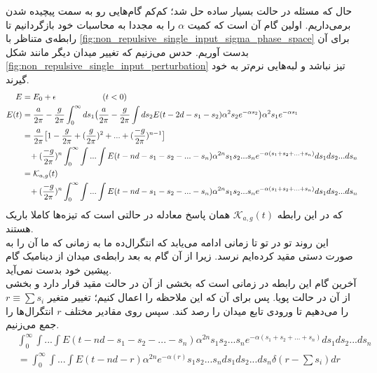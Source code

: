 حال که مسئله در حالت بسیار ساده حل شد؛ کم‌کم گام‌هایی رو به سمت پیچیده شدن برمی‌داریم. اولین گام آن است که کمیت $\alpha$ را به مجددا به محاسبات خود بازگردانیم تا رابطه‌ی متناظر با
\ref{fig:non_repulsive_single_input_sigma_phase_space}
برای آن بدست آوریم. حدس می‌زنیم که تغییر میدان دیگر مانند شکل 
\ref{fig:non_repulsive_single_input_perturbation}
تیز نباشد و لبه‌هایی نرم‌تر به خود گیرند.
\begin{align}
	E &= E_0 + \epsilon \hspace{2cm} (t<0) \\
	E(t) &= \frac{a}{2\pi} - \frac{g}{2\pi} \int_{0}^{\infty} ds_1 \big( \frac{a}{2\pi} - \frac{g}{2\pi} \int ds_2 E(t - 2d - s_1 - s_2) \alpha^2 s_2 e^{-\alpha s_2} \big) \alpha^2 s_1 e^{-\alpha s_1} \\
	&= \frac{a}{2\pi} \big[ 1 - \frac{g}{2\pi} + (\frac{g}{2\pi})^2 + ... + (\frac{-g}{2\pi})^{n - 1} \big] \\
	&\hspace{3mm}+ (\frac{-g}{2\pi})^{n} \int_{0}^{\infty}\int ... \int E(t - nd - s_1 - s_2 - ... - s_n) \alpha^{2n} s_1 s_2 ... s_n e^{-\alpha(s_1 + s_2 + ... + s_n)} ds_1 ds_2 ... ds_n\\
	&= \mathcal{K}_{a,g}(t)\\
	&\hspace{3mm}+ (\frac{-g}{2\pi})^{n} \int_{0}^{\infty}\int ... \int E(t - nd - s_1 - s_2 - ... - s_n) \alpha^{2n} s_1 s_2 ... s_n e^{-\alpha(s_1 + s_2 + ... + s_n)} ds_1 ds_2 ... ds_n
\end{align}
که در این رابطه 
$\mathcal{K}_{a,g}(t)$
همان پاسخ معادله در حالتی است که تیزه‌ها کاملا باریک هستند. \\
این روند تو در تو تا زمانی ادامه می‌یابد که انتگرال‌ده ما به زمانی که ما آن را به صورت دستی مقید کرده‌ایم نرسد. زیرا از آن گام به بعد رابطه‌ی میدان از دینامیک گام پیشین خود بدست نمی‌آید.\\
آخرین گام این رابطه در زمانی است که بخشی از آن در حالت مقید قرار دارد و بخشی از آن در حالت پویا. پس برای آن که این ملاحظه را اعمال کنیم؛ تغییر متغیر
$r \equiv \sum s_i$
را می‌دهیم تا ورودی تابع میدان را رصد کند. سپس روی مقادیر مختلف $r$ انتگرال‌ها را جمع می‌زنیم.
\begin{align}
	& \int_{0}^{\infty}\int ... \int E(t - nd - s_1 - s_2 - ... - s_n)
	\alpha^{2n} s_1 s_2 ... s_n  e^{-\alpha(s_1 + s_2 + ... + s_n)} ds_1 ds_2 ... ds_n\\
	&= \int_{0}^{\infty}\int ... \int E(t - nd - r) \alpha^{2n} e^{-\alpha(r)} s_1 s_2 ... s_n ds_1 ds_2 ... ds_n \delta(r-\sum s_i) dr
\end{align}
